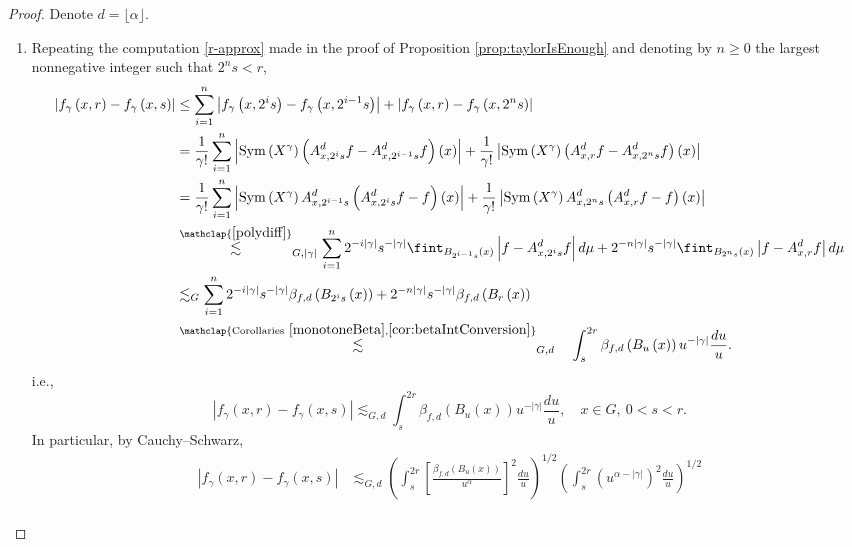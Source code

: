 \documentclass[11pt,reqno]{amsart}
\newcommand{\1}{\mathbf 1}
\begin{document}
\begin{proof}Denote $d=\lfloor\alpha\rfloor$.
\begin{enumerate}
    \item Repeating the computation \eqref{r-approx} made in the proof of Proposition \ref{prop:taylorIsEnough} and denoting by $n\ge 0$ the largest nonnegative integer such that $2^ns<r$,
\begin{align*}
    \left|f_\gamma \left(x,r\right)-f_\gamma\left(x,s\right)\right|&\le \sum_{i=1}^n\left|f_\gamma \left(x,2^is\right)-f_\gamma\left(x,2^{i-1}s\right)\right|+\left|f_\gamma \left(x,r\right)-f_\gamma\left(x,2^ns\right)\right|\\
    &= \frac{1}{\gamma!} \sum_{i=1}^n\left|\operatorname{Sym}\left(X^\gamma\right)\left(A^d_{x,2^is}f-A^d_{x,2^{i-1}s}f\right)\left(x\right)\right|+\frac{1}{\gamma!} \left|\operatorname{Sym}\left(X^\gamma\right)\left(A^d_{x,r}f-A^d_{x,2^{n}s}f\right)\left(x\right)\right|\\
    &= \frac{1}{\gamma!} \sum_{i=1}^n\left|\operatorname{Sym}\left(X^\gamma\right)A^d_{x,2^{i-1}s}\left(A^d_{x,2^is}f-f\right)\left(x\right)\right|+\frac{1}{\gamma!} \left|\operatorname{Sym}\left(X^\gamma\right)A^d_{x,2^{n}s}\left(A^d_{x,r}f-f\right)\left(x\right)\right|\\
    &\stackrel{\mathclap{\eqref{polydiff}}}{\lesssim}_{G,\left|\gamma\right|}  \sum_{i=1}^n 2^{-i\left|\gamma\right|}s^{-\left|\gamma\right|}\fint_{B_{2^{i-1}s}\left(x\right)}\left|f-A^d_{x,2^is}f\right|d\mu+2^{-n\left|\gamma\right|}s^{-\left|\gamma\right|}\fint_{B_{2^{n}s}\left(x\right)}\left|f-A^d_{x,r}f\right|d\mu\\
    &\lesssim_{G}  \sum_{i=1}^n 2^{-i\left|\gamma\right|}s^{-\left|\gamma\right|}\beta_{f,d}\left(B_{2^is}\left(x\right)\right)+2^{-n\left|\gamma\right|}s^{-\left|\gamma\right|}\beta_{f,d}\left(B_{r}\left(x\right)\right)\\
    &\stackrel{\mathclap{\mathrm{Corollaries}~\ref{monotoneBeta},\ref{cor:betaIntConversion}}}{\lesssim}_{G,d}\quad \int_s^{2r} \beta_{f,d}\left(B_u\left(x\right)\right)u^{-\left|\gamma\right|}\frac{du}{u}.
\end{align*}
i.e.,
\[
\left|f_\gamma \left(x,r\right)-f_\gamma\left(x,s\right)\right|\lesssim_{G,d} \int_{s}^{2r} \beta_{f,d}\left(B_u\left(x\right)\right)u^{-\left|\gamma\right|}\frac{du}{u},\quad x\in G,~0<s<r.
\]
In particular, by Cauchy--Schwarz,
\begin{align*}
\left|f_\gamma \left(x,r\right)-f_\gamma\left(x,s\right)\right|&\lesssim_{G,d} \left(\int_{s}^{2r}\left[\frac{\beta_{f,d}\left(B_u\left(x\right)\right)}{u^\alpha}\right]^2\frac{du}{u}\right)^{1/2}\left(\int_{s}^{2r}\left(u^{\alpha-\left|\gamma\right|}\right)^2\frac{du}{u}\right)^{1/2}\\

\end{align*}
\end{enumerate}
\end{proof}
\end{document}
